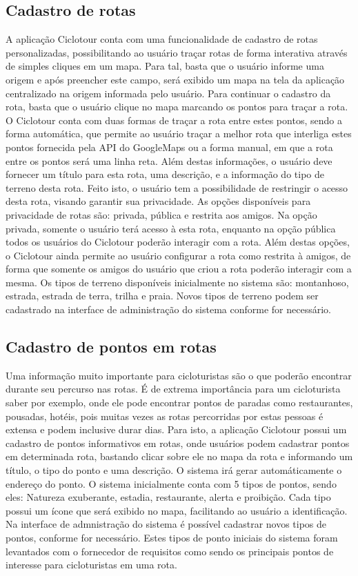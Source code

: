 \subsection{Cadastro de rotas}
A aplicação Ciclotour conta com uma funcionalidade de cadastro de rotas personalizadas, possibilitando ao usuário traçar rotas de forma interativa 
através de simples cliques em um mapa. Para tal, basta que o usuário informe uma origem e após preencher este campo, será exibido um mapa na 
tela da aplicação centralizado na origem informada pelo usuário. Para continuar o cadastro da rota, basta que o usuário clique no mapa marcando os 
pontos para traçar a rota. O Ciclotour conta com duas formas de traçar a rota entre estes pontos, sendo a forma automática, que permite ao usuário 
traçar a melhor rota que interliga estes pontos fornecida pela API do GoogleMaps ou a forma manual, em que a rota entre os pontos será uma linha reta. 
Além destas informações, o usuário deve fornecer um título para esta rota, uma descrição, e a informação do tipo de terreno desta rota. Feito isto, o 
usuário tem a possibilidade de restringir o acesso desta rota, visando garantir sua privacidade. As opções disponíveis para privacidade de rotas são:
privada, pública e restrita aos amigos. Na opção privada, somente o usuário terá acesso à esta rota, enquanto na opção pública todos os usuários do 
Ciclotour poderão interagir com a rota. Além destas opções, o Ciclotour ainda permite ao usuário configurar a rota como restrita à amigos, de forma
que somente os amigos do usuário que criou a rota poderão interagir com a mesma. Os tipos de terreno disponíveis inicialmente no sistema são: 
montanhoso, estrada, estrada de terra, trilha e praia. Novos tipos de terreno podem ser cadastrado na interface de administração do sistema
conforme for necessário.

\subsection{Cadastro de pontos em rotas}
Uma informação muito importante para cicloturistas são o que poderão encontrar durante seu percurso nas rotas. É de extrema importância para um 
cicloturista saber por exemplo, onde ele pode encontrar pontos de paradas como restaurantes, pousadas, hotéis, pois muitas vezes as rotas percorridas
por estas pessoas é extensa e podem inclusive durar dias. Para isto, a aplicação Ciclotour possui um cadastro de pontos informativos em rotas, onde
usuários podem cadastrar pontos em determinada rota, bastando clicar sobre ele no mapa da rota e informando um título, o tipo do ponto e uma 
descrição. O sistema irá gerar automáticamente o endereço do ponto. O sistema inicialmente conta com 5 tipos de pontos, sendo eles: Natureza 
exuberante, estadia, restaurante, alerta e proibição. Cada tipo possui um ícone que será exibido no mapa, facilitando ao usuário a identificação.
Na interface de admnistração do sistema é possível cadastrar novos tipos de pontos, conforme for necessário. Estes tipos de ponto iniciais do 
sistema foram levantados com o fornecedor de requisitos como sendo os principais pontos de interesse para cicloturistas em uma rota.

